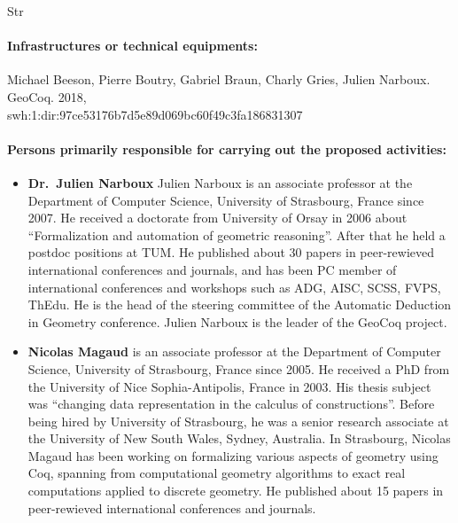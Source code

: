 \begin{sitedescription}{Str}
\paragraph{Infrastructures or technical equipments:}


\begin{compactitem}
\item Michael Beeson, Pierre Boutry, Gabriel Braun, Charly Gries, Julien Narboux. GeoCoq. 2018,\\swh:1:dir:97ce53176b7d5e89d069bc60f49c3fa186831307
\end{compactitem}

\paragraph{Persons primarily responsible for carrying out the proposed activities:}

\begin{itemize}
\item{\bf Dr.\ Julien Narboux}
Julien Narboux is an associate professor at the Department of Computer Science, University of Strasbourg, France since 2007. He received a doctorate from University of Orsay in 2006 about “Formalization and automation of geometric reasoning”. After that he held a postdoc positions at TUM.
He published about 30 papers in peer-rewieved international conferences and journals, and has been PC member of international conferences and workshops such as ADG, AISC, SCSS, FVPS, ThEdu. He is the head of the steering committee of the Automatic Deduction in Geometry conference. Julien Narboux is the leader of the GeoCoq project.

\item{\bf Nicolas Magaud} is an associate professor at the Department of
Computer Science, University of Strasbourg, France since 2005. He
received a PhD from the University of Nice Sophia-Antipolis, France in
2003. His thesis subject was ``changing data representation in the
calculus of constructions''. Before being hired by University of
Strasbourg, he was a senior research associate at the University of
New South Wales, Sydney, Australia. In Strasbourg, Nicolas Magaud
has been working on formalizing various aspects of geometry using Coq, spanning from
computational geometry algorithms to exact real computations applied to
discrete geometry. He published about 15 papers in peer-rewieved
international conferences and journals.  


\end{itemize}
\end{sitedescription}
